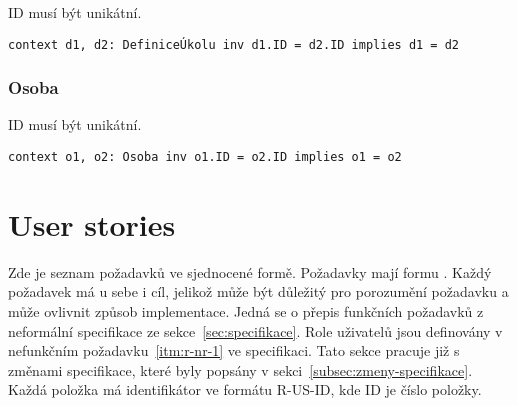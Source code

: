 ID musí být unikátní.

\begin{verbatim}
context d1, d2: DefiniceÚkolu inv d1.ID = d2.ID implies d1 = d2
\end{verbatim}

\subsubsection{Osoba}

ID musí být unikátní.

\begin{verbatim}
context o1, o2: Osoba inv o1.ID = o2.ID implies o1 = o2
\end{verbatim}


\section{User stories}\label{sec:user-stories}

Zde je seznam požadavků ve sjednocené formě.
Požadavky mají formu .
Každý požadavek má u sebe i cíl, jelikož může být důležitý pro porozumění požadavku a může ovlivnit způsob implementace.
Jedná se o přepis funkčních požadavků z neformální specifikace ze sekce~\ref{sec:specifikace}.
Role uživatelů jsou definovány v nefunkčním požadavku~\ref{itm:r-nr-1} ve specifikaci.
Tato sekce pracuje již s změnami specifikace, které byly popsány v sekci~\ref{subsec:zmeny-specifikace}.
Každá položka má identifikátor ve formátu R-US-ID, kde ID je číslo položky.

